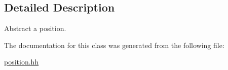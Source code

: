 \subsection{Detailed Description}
Abstract a position. 

The documentation for this class was generated from the following file\+:\begin{DoxyCompactItemize}
\item 
\hyperlink{position_8hh}{position.\+hh}\end{DoxyCompactItemize}
